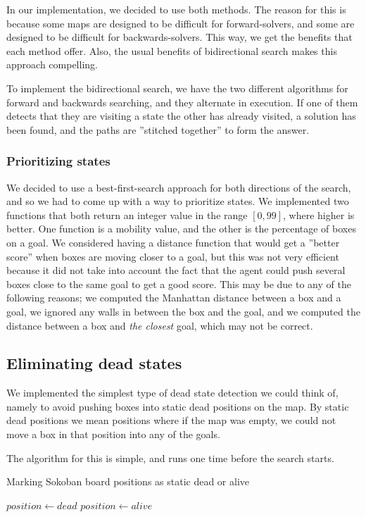 \documentclass[a4paper,11pt]{article}
\begin{document}
In our implementation, we decided to use both methods.
The reason for this is because some maps are designed to be difficult
for forward-solvers, and some are designed to be difficult for backwards-solvers.
This way, we get the benefits that each method offer.
Also, the usual benefits of bidirectional search makes this approach compelling.

To implement the bidirectional search, we have the two different algorithms
for forward and backwards searching, and they alternate in execution.
If one of them detects that they are visiting a state the other has already visited,
a solution has been found, and the paths are ''stitched together'' to form the answer.

\subsubsection{Prioritizing states}

We decided to use a best-first-search approach for both directions of the search,
and so we had to come up with a way to prioritize states.
We implemented two functions that both return an integer value in the range
$[0, 99]$, where higher is better.
One function is a mobility value, and the other is the percentage of boxes on a goal.
We considered having a distance function that would get a ''better score''
when boxes are moving closer to a goal, but this was not very efficient
because it did not take into account the fact that the agent could push several boxes
close to the same goal to get a good score.
This may be due to any of the following reasons;
	we computed the Manhattan distance between a box and a goal,
	we ignored any walls in between the box and the goal,
	and we computed the distance between a box and \emph{the closest} goal, which may not be correct.

\subsection{Eliminating dead states}

We implemented the simplest type of dead state detection we could think of,
namely to avoid pushing boxes into static dead positions on the map.
By static dead positions we mean positions where if the map was empty,
we could not move a box in that position into any of the goals.

The algorithm for this is simple, and runs one time before the search starts.

\clearpage
\begin{algorithm}
\caption{Marking Sokoban board positions as static dead or alive}
\label{alg:dead_positions}
\begin{algorithmic}
			\State $position \gets dead$
		\EndFor
					\State $position \gets alive$
				\EndIf
			\EndFor
		\EndFor
	\EndFunction
\end{algorithmic}
\end{algorithm}
\end{document}
